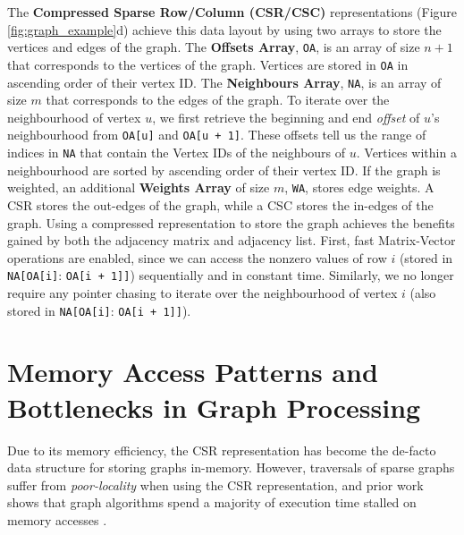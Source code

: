 The \textbf{Compressed Sparse Row/Column (\ac{CSR}/\ac{CSC})} representations (Figure \ref{fig:graph_example}d) achieve this data layout by using two arrays to store the vertices and edges of the graph. The \textbf{Offsets Array}, \texttt{OA}, is an array of size $n+1$ that corresponds to the vertices of the graph. Vertices are stored in \texttt{OA} in ascending order of their vertex ID. The \textbf{Neighbours Array}, \texttt{NA}, is an array of size $m$ that corresponds to the edges of the graph. To iterate over the neighbourhood of vertex $u$, we first retrieve the beginning and end \textit{offset} of $u$'s neighbourhood from \texttt{OA[u]} and \texttt{OA[u + 1]}. These offsets tell us the range of indices in \texttt{NA} that contain the Vertex IDs of the neighbours of $u$. Vertices within a neighbourhood are sorted by ascending order of their vertex ID. If the graph is weighted, an additional \textbf{Weights Array} of size $m$, \texttt{WA}, stores edge weights. A \ac{CSR} stores the out-edges of the graph, while a \ac{CSC} stores the in-edges of the graph. Using a compressed representation to store the graph achieves the benefits gained by both the adjacency matrix and adjacency list.
First, fast Matrix-Vector operations are enabled, since we can access the nonzero values of row $i$ (stored in \texttt{NA[}\texttt{OA[i]}: \texttt{OA[i + 1]}\texttt{]}) sequentially and in constant time.
Similarly, we no longer require any pointer chasing to iterate over the neighbourhood of vertex $i$ (also stored in \texttt{NA[}\texttt{OA[i]}: \texttt{OA[i + 1]}\texttt{]}).

\section{Memory Access Patterns and Bottlenecks in Graph Processing}
Due to its memory efficiency, the \ac{CSR} representation has become the de-facto data structure for storing graphs in-memory. 
However, traversals of sparse graphs suffer from \textit{poor-locality} when using the \ac{CSR} representation,
and prior work shows that graph algorithms spend a majority of execution time stalled on memory accesses \cite{zhang2016optimizing}. 

